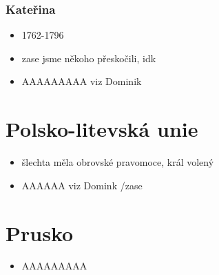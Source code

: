 \documentclass{article}
\begin{document}
\section{Kateřina}
\begin{itemize}
  \item 1762-1796
  \item zase jsme někoho přeskočili, idk
  \item AAAAAAAAA viz Dominik
\end{itemize}

\part{Polsko-litevská unie}
\begin{itemize}
  \item šlechta měla obrovské pravomoce, král volený
  \item AAAAAA viz Domink /zase
\end{itemize}

\part{Prusko}
\begin{itemize}
  \item AAAAAAAAA
\end{itemize}
\end{document}
